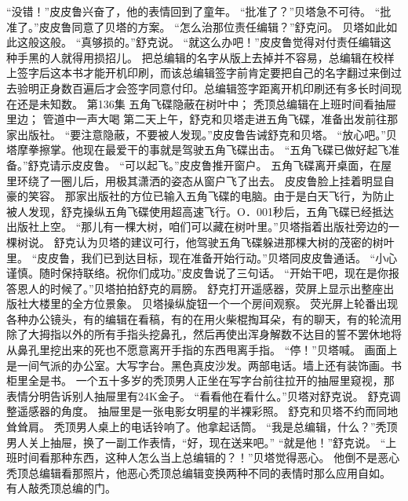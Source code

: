 \documentclass[a4paper,12pt,UTF8,twoside]{ctexbook}
\begin{document}
        “没错！”皮皮鲁兴奋了，他的表情回到了童年。 
        “批准了？”贝塔急不可待。 
        “批准了。”皮皮鲁同意了贝塔的方案。 
        “怎么治那位责任编辑？”舒克问。 
        贝塔如此如此这般这般。 
        “真够损的。”舒克说。 
        “就这么办吧！”皮皮鲁觉得对付责任编辑这种手黑的人就得用损招儿。 
        把总编辑的名字从版上去掉并不容易，总编辑在校样上签字后这本书才能开机印刷，而该总编辑签字前肯定要把自己的名字翻过来倒过去验明正身数百遍后才会签字同意付印。总编辑签字距离开机印刷还有多长时间现在还是未知数。   第136集 
        五角飞碟隐蔽在树叶中； 
        秃顶总编辑在上班时间看抽屉里边； 
        管道中一声大喝   
        第二天上午，舒克和贝塔走进五角飞碟，准备出发前往那家出版社。 
        “要注意隐蔽，不要被人发现。”皮皮鲁告诫舒克和贝塔。 
        “放心吧。”贝塔摩拳擦掌。他现在最爱干的事就是驾驶五角飞碟出击。 
        “五角飞碟已做好起飞准备。”舒克请示皮皮鲁。 
        “可以起飞。”皮皮鲁推开窗户。 
        五角飞碟离开桌面，在屋里环绕了一圈儿后，用极其潇洒的姿态从窗户飞了出去。 
        皮皮鲁脸上挂着明显自豪的笑容。 
        那家出版社的方位已输入五角飞碟的电脑。由于是白天飞行，为防止被人发现，舒克操纵五角飞碟使用超高速飞行。O．001秒后，五角飞碟已经抵达出版社上空。 
        “那儿有一棵大树，咱们可以藏在树叶里。”贝塔指着出版社旁边的一棵树说。 
        舒克认为贝塔的建议可行，他驾驶五角飞碟躲进那棵大树的茂密的树叶里。 
        “皮皮鲁，我们已到达目标，现在准备开始行动。”贝塔同皮皮鲁通话。 
        “小心谨慎。随时保持联络。祝你们成功。”皮皮鲁说了三句话。 
        “开始干吧，现在是你报答恩人的时候了。”贝塔拍拍舒克的肩膀。 
        舒克打开遥感器，荧屏上显示出整座出版社大楼里的全方位景象。 
        贝塔操纵旋钮一个一个房间观察。 
        荧光屏上轮番出现各种办公镜头，有的编辑在看稿，有的在用火柴棍掏耳朵，有的聊天，有的轮流用除了大拇指以外的所有手指头挖鼻孔，然后再使出浑身解数不达目的誓不罢休地将从鼻孔里挖出来的死也不愿意离开手指的东西甩离手指。 
        “停！”贝塔喊。 
        画面上是一间气派的办公室。大写字台。黑色真皮沙发。两部电话。墙上还有装饰画。书柜里全是书。 
        一个五十多岁的秃顶男人正坐在写字台前往拉开的抽屉里窥视，那表情分明告诉别人抽屉里有24K金子。 
        “看看他在看什么。”贝塔对舒克说。 
        舒克调整遥感器的角度。 
        抽屉里是一张电影女明星的半裸彩照。 
        舒克和贝塔不约而同地耸耸肩。 
        秃顶男人桌上的电话铃响了。他拿起话筒。 
        “我是总编辑，什么？”秃顶男人关上抽屉，换了一副工作表情，“好，现在送来吧。” 
        “就是他！”舒克说。 
        “上班时间看那种东西，这种人怎么当上总编辑的？！”贝塔觉得恶心。 
        他倒不是恶心秃顶总编辑看那照片，他恶心秃顶总编辑变换两种不同的表情时那么应用自如。 
        有人敲秃顶总编的门。 
\end{document}

